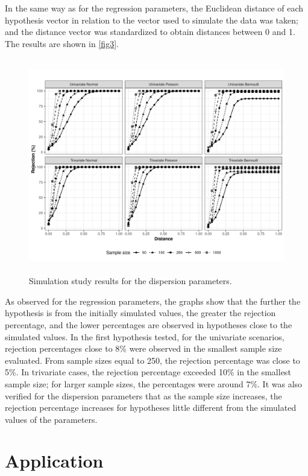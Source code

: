 \documentclass[Review,sagev,times, doublespace]{sagej}
\begin{document}
In the same way as for the regression parameters, the Euclidean distance of each hypothesis vector in relation to the vector used to simulate the data was taken; and the distance vector was standardized to obtain distances between 0 and 1. The results are shown in \autoref{fig3}.

\begin{figure}[h]
\centering
\includegraphics[width=29.6pc,height=22.2pc]{FIGURE3.jpeg}
\caption{Simulation study results for the dispersion parameters.\label{fig3}}
\end{figure}

As observed for the regression parameters, the graphs show that the further the hypothesis is from the initially simulated values, the greater the rejection percentage, and the lower percentages are observed in hypotheses close to the simulated values. In the first hypothesis tested, for the univariate scenarios, rejection percentages close to 8\% were observed in the smallest sample size evaluated. From sample sizes equal to 250, the rejection percentage was close to 5\%. In trivariate cases, the rejection percentage exceeded 10\% in the smallest sample size; for larger sample sizes, the percentages were around 7\%. It was also verified for the dispersion parameters that as the sample size increases, the rejection percentage increases for hypotheses little different from the simulated values of the parameters.


\section{Application}\label{sec6}
\end{document}
